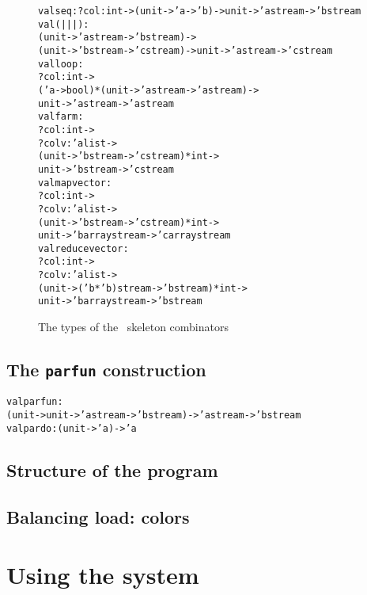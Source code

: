 \begin{figure}[htbf]
\begin{alltt}
val seq : ?col:int -> (unit -> 'a -> 'b) -> unit -> 'a stream -> 'b stream
val ( ||| ) :
  (unit -> 'a stream -> 'b stream) ->
  (unit -> 'b stream -> 'c stream) -> unit -> 'a stream -> 'c stream
val loop :
  ?col:int ->
  ('a -> bool) * (unit -> 'a stream -> 'a stream) ->
  unit -> 'a stream -> 'a stream
val farm :
  ?col:int ->
  ?colv:'a list ->
  (unit -> 'b stream -> 'c stream) * int ->
  unit -> 'b stream -> 'c stream
val mapvector :
  ?col:int ->
  ?colv:'a list ->
  (unit -> 'b stream -> 'c stream) * int ->
  unit -> 'b array stream -> 'c array stream
val reducevector :
  ?col:int ->
  ?colv:'a list ->
  (unit -> ('b * 'b) stream -> 'b stream) * int ->
  unit -> 'b array stream -> 'b stream
\end{alltt}
\caption{The types of the \ocamlpiiil\ skeleton combinators }
\end{figure}

\subsection{ The  {\tt parfun} construction }

\begin{alltt}
val parfun :
  (unit -> unit -> 'a stream -> 'b stream) -> 'a stream -> 'b stream
val pardo : (unit -> 'a) -> 'a
\end{alltt}

\subsection{ Structure of the program }\label{f11}
\subsection{ Balancing load: colors }

\section{Using the system}
